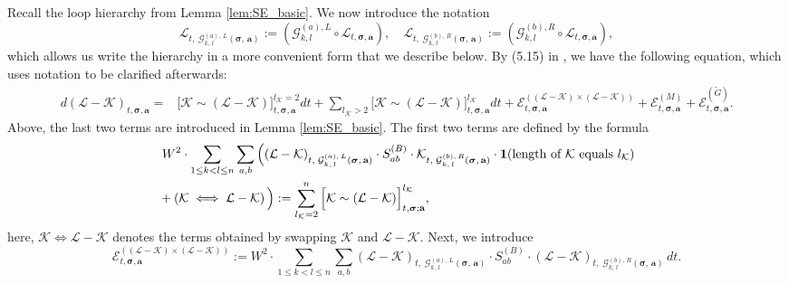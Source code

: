  Recall the loop hierarchy from Lemma \ref{lem:SE_basic}. We now introduce the notation
$$
\mathcal{L}_{t,\;  \mathcal{G}^{(a), \,L}_{k, \,l}\left(\boldsymbol{\sigma},\, \textbf{a}\right)} := \left( \mathcal{G}^{(a), L}_{k, l} \circ \mathcal{L}_{t, \boldsymbol{\sigma}, \textbf{a}} \right), \quad  
\mathcal{L}_{t,\;  \mathcal{G}^{(b), \,R}_{k, \,l}\left(\boldsymbol{\sigma},\, \textbf{a}\right)} := \left( \mathcal{G}^{(b), R}_{k, l} \circ \mathcal{L}_{t, \boldsymbol{\sigma}, \textbf{a}} \right),
$$
which allows us write the hierarchy in a more convenient form that we describe below. By (5.15) in \cite{YY_25}, we have the following equation, which uses notation to be clarified afterwards:
\begin{align}\label{eq_L-Keee}
    d(\mathcal{L} - \mathcal{K})_{t, \boldsymbol{\sigma}, \textbf{a}} = &
    \Big[\mathcal{K} \sim (\mathcal{L} - \mathcal{K})\Big]^{l_\mathcal{K} = 2}_{t, \boldsymbol{\sigma}, \textbf{a}}dt + \sum_{l_\mathcal{K} > 2} \Big[\mathcal{K} \sim (\mathcal{L} - \mathcal{K})\Big]^{l_\mathcal{K}}_{t, \boldsymbol{\sigma}, \textbf{a}}dt + \mathcal{E}^{((\mathcal{L} - \mathcal{K}) \times (\mathcal{L} - \mathcal{K}))}_{t, \boldsymbol{\sigma}, \textbf{a}} +
    \mathcal{E}^{(M)}_{t, \boldsymbol{\sigma}, \textbf{a}} +
    \mathcal{E}^{(\widetilde{G})}_{t, \boldsymbol{\sigma}, \textbf{a}}.
\end{align} 
Above, the last two terms are introduced in Lemma \ref{lem:SE_basic}. The first two terms are defined by the formula
\begin{align}\label{DefKsimLK}
&\; W^{2}\cdot \sum_{1 \leq k < l \leq n} \sum_{a, b}  
   \Big( 
   (\mathcal{L} - \mathcal{K})_{t,\;  \mathcal{G}^{(a), \,L}_{k, \,l}\left(\boldsymbol{\sigma},\, \textbf{a}\right)} 
   \cdot S^{(B)}_{ab}
   \cdot 
   \mathcal{K}_{t,\;  \mathcal{G}^{(b), \,R}_{k, \,l}\left(\boldsymbol{\sigma},\, \textbf{a}\right)} \cdot \textbf{1}(\text{length of $\mathcal{K}$ equals } l_\mathcal{K})   \nonumber \\
   & + \left(\mathcal{K} \iff \mathcal{L-K} \right) \Big) 
    := \sum_{l_{\cal K}=2}^n\Big[\mathcal{K} \sim (\mathcal{L} - \mathcal{K})\Big]^{l_\mathcal{K}}_{t, \boldsymbol{\sigma}; \textbf{a}},
\end{align}
here, \( \mathcal{K} \iff \mathcal{L-K} \) denotes the terms obtained by swapping \(\mathcal{K}\) and \(\mathcal{L-K}\). Next, we introduce
\begin{equation}\label{def_ELKLK}
    \mathcal{E}^{((\mathcal{L} - \mathcal{K}) \times (\mathcal{L} - \mathcal{K}))}_{t, \boldsymbol{\sigma}, \textbf{a}} :=
    W^{2}\cdot\sum_{1 \leq k < l \leq n} \sum_{a, b} (\mathcal{L} - \mathcal{K})_{t,\;  \mathcal{G}^{(a), \,L}_{k, \,l}\left(\boldsymbol{\sigma},\, \textbf{a}\right)} \cdot  S^{(B)}_{ab} \cdot (\mathcal{L} - \mathcal{K})_{t,\;  \mathcal{G}^{(b), \,R}_{k, \,l}\left(\boldsymbol{\sigma},\, \textbf{a}\right)} \, dt.
\end{equation}


